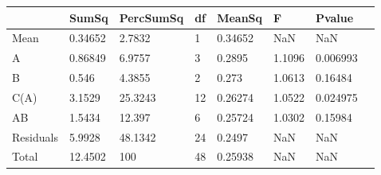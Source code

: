 \begin{table} 
\begin{tabular}{llllllll}
 & SumSq & PercSumSq & df & MeanSq & F & Pvalue \\ 
 \hline 
Mean & 0.34652 & 2.7832 & 1 & 0.34652 & NaN & NaN \\ 
A & 0.86849 & 6.9757 & 3 & 0.2895 & 1.1096 & 0.006993 \\ 
B & 0.546 & 4.3855 & 2 & 0.273 & 1.0613 & 0.16484 \\ 
C(A) & 3.1529 & 25.3243 & 12 & 0.26274 & 1.0522 & 0.024975 \\ 
AB & 1.5434 & 12.397 & 6 & 0.25724 & 1.0302 & 0.15984 \\ 
Residuals & 5.9928 & 48.1342 & 24 & 0.2497 & NaN & NaN \\ 
Total & 12.4502 & 100 & 48 & 0.25938 & NaN & NaN \\ 
\end{tabular} 
\end{table} 
